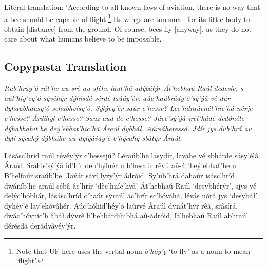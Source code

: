 \documentclass[a4paper, 12pt, twoside, openright, final]{book}
\let \w \textit
\begin{document}
\medskip\noindent
Literal translation: ‘According to all known laws of aviation, there is no way that a bee should be capable of flight.\footnote{
Note that UF here uses the verbal noun \w{b’hóy’ẹ} ‘to fly’ as a noun to mean ‘flight’.}
Its wings are too small for its little body to obtain [distance] from the ground. Of course, bees fly [anyway], as
they do not care about what humans believe to be impossible.

\subsection{Copypasta Translation}
{\itshape
Rub’hráy’ó rát’he au sré au sfèhe laut’hâ adŷbáłýr Át’hebhaú Raúl dedesle, s aút’hiy’ey’ó sývéhýr dýhisdé sérdé laúây’êr;
aúc’haúbrâdy’ó’sý’ýâ vé dúr dyhaúbhausy’ô sehabhvísy’ô. Sýlývy’ér saúr c’hesse? Lec’hdr\-aúv\-nét’hic’hâ nérje c’hesse?
Árdihyl c’hesse? Sauz-aud de c’hesse? Jávé’sý’ýâ jrét’hádé dedónéle dýha\-bha\-hit’he deý’ebhat’hic’hâ Áraúl dybháł.
Aúrsáheressá. Jdír jys dub’hrá au dylí sýcahý dýbháhe au dylýáv́áy’é b’hýcahý sbáłýr Áraúl.

Lásásc’hríd raúl révéy’ýr c’hessejú? Léraúb’he lasydír, lavâhe vé sbhárde sásy’élâ Áraúl. Sráhis’sý’ýâ id’hír deb’hýlnér
u b’hesaúr rêvú aû-át’heý’ebhat’he u B’helfaúr sraúb’he. Jav́ár sáví lyzy’ýr ádróid. Sy’u\-b’h\-rá dahaúr isásc’hríd
dwáníb’he araúl sébâ âc’hrír ‘dèc’hníc’hvâ’ Át’hebhaú Raúl ‘desybhérýr’, sjys vé delýc’hóbhár, lásásc’hríd c’haúr sýraúl
âc’hrír sc’hóváhá, lévás nórâ jys ‘desybáł’ dyhéy’é la\-y’e\-hó\-vâ\-hér. Aúc’hóhid’héy’ó laúrvé Áraúl dynát’hýr rêâ, srâsírá,
dwác’hóvníc’h âbáł dývrê b’hehbár\-di\-hi\-bhá aû-á\-dr\-ó\-id, It’hebhaú Raúl abhraúl dérésdâ derâdvâvéy’ýr.
}

\end{document}
